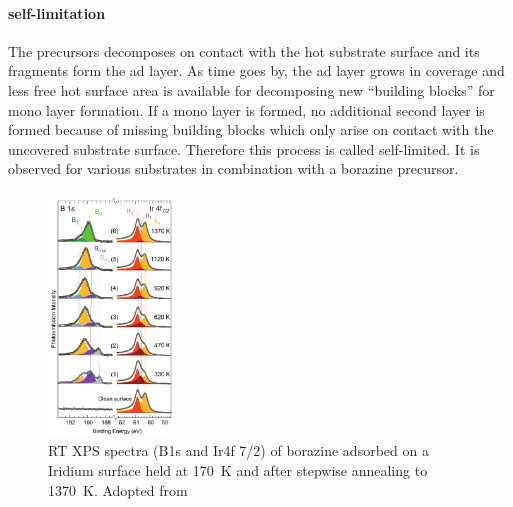 \paragraph{self-limitation}
The precursors decomposes on contact with the hot substrate surface and its fragments form the ad layer. As time goes by, the ad layer grows in coverage and less free hot surface area is available for decomposing new ``building blocks'' for mono layer formation. If a mono layer is formed, no additional second layer is formed because of missing building blocks which only arise on contact with the uncovered substrate surface. Therefore this process is called self-limited. It is observed \cite{corso_h-bn_2005, cavar_single_2008, muller_epitaxial_2010} for various substrates in combination with a borazine precursor.

%

%

\begin{figure}\centering
	\includegraphics[width=0.3\textwidth]{./images/07571n_fig5.png}
	\caption{RT XPS spectra (B1s and Ir4f 7/2) of borazine adsorbed on a Iridium surface held at \SI{170}{\kelvin} and after stepwise annealing to \SI{1370}{\kelvin}. Adopted from \cite{orlando_epitaxial_2012}}
	\label{fig:borazine-TPG-on-Ir}
\end{figure}
	
